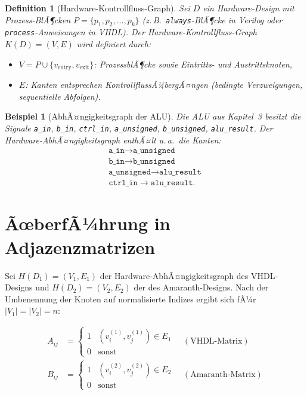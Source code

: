 ﻿\documentclass[12pt,a4paper]{report}
\newtheorem{definition}{Definition}[section]
\newtheorem{beispiel}{Beispiel}[section]
\begin{document}
\begin{definition}[Hardware-Kontrollfluss-Graph]
\label{def:hcfg}
Sei $D$ ein Hardware-Design mit Prozess-BlÃ¶cken $P = \{p_1, p_2, \ldots, p_k\}$ (z.\,B.\ \texttt{always}-BlÃ¶cke in Verilog oder \texttt{process}-Anweisungen in VHDL). Der \emph{Hardware-Kontrollfluss-Graph} $K(D) = (V, E)$ wird definiert durch:
\begin{itemize}
    \item $V = P \cup \{v_{\mathrm{entry}}, v_{\mathrm{exit}}\}$: ProzessblÃ¶cke sowie Eintritts- und Austrittsknoten,
    \item $E$: Kanten entsprechen KontrollflussÃ¼bergÃ¤ngen (bedingte Verzweigungen, sequentielle Abfolgen).
\end{itemize}
\end{definition}

\begin{beispiel}[AbhÃ¤ngigkeitsgraph der ALU]
\label{bsp:alu_graph}
Die ALU aus Kapitel~3 besitzt die Signale \texttt{a\_in}, \texttt{b\_in}, \texttt{ctrl\_in}, \texttt{a\_unsigned}, \texttt{b\_unsigned}, \texttt{alu\_result}. Der Hardware-AbhÃ¤ngigkeits\-graph enthÃ¤lt u.\,a.\ die Kanten:
\begin{align}
	\texttt{a\_in} \to \texttt{a\_unsigned} \\ \texttt{b\_in} \to \texttt{b\_unsigned} \\ \texttt{a\_unsigned} \to \texttt{alu\_result} \\ \texttt{ctrl\_in} \to \texttt{alu\_result}.	
\end{align}

\end{beispiel}

\section{ÃœberfÃ¼hrung in Adjazenzmatrizen}

Sei $H(D_1) = (V_1, E_1)$ der Hardware-AbhÃ¤ngigkeitsgraph des VHDL-Designs und $H(D_2) = (V_2, E_2)$ der des Amaranth-Designs. Nach der Umbenennung der Knoten auf normalisierte Indizes ergibt sich fÃ¼r $|V_1| = |V_2| = n$:

\begin{align*}
A_{ij} &= \begin{cases} 1 & (v_i^{(1)}, v_j^{(1)}) \in E_1 \\ 0 & \text{sonst} \end{cases}
\quad (\text{VHDL-Matrix})\\
B_{ij} &= \begin{cases} 1 & (v_i^{(2)}, v_j^{(2)}) \in E_2 \\ 0 & \text{sonst} \end{cases}
\quad (\text{Amaranth-Matrix})
\end{align*}
\end{document}
